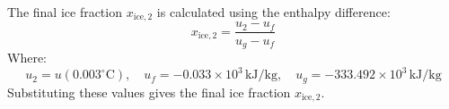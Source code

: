 The final ice fraction \( x_{\text{ice},2} \) is calculated using the enthalpy difference:  
\[
x_{\text{ice},2} = \frac{u_2 - u_f}{u_g - u_f}
\]  
Where:  
\[
u_2 = u(0.003^\circ\text{C}), \quad u_f = -0.033 \times 10^3 \, \text{kJ/kg}, \quad u_g = -333.492 \times 10^3 \, \text{kJ/kg}
\]  
Substituting these values gives the final ice fraction \( x_{\text{ice},2} \).
